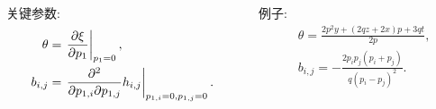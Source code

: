 \begin{frame}
\begin{columns}
\begin{column}{0.5\textwidth}
关键参数:
\[
\begin{split}
    \theta &= \left.{\frac{\partial \xi}{\partial p_1}}\right|_{p_1=0}, \\
    b_{i,j}&= \left.{\frac{\partial^2}{\partial p_{1,i}\partial p_{1,j}}h_{i,j}}\right|_{p_{1,i}=0,p_{1,j}=0}.
\end{split}
\]
\end{column}
\begin{column}{0.5\textwidth}
例子:
\[
\begin{split}
    &\theta=\frac{2p^2y+(2qz+2x)p+3qt}{2p}, \\ 
    &b_{i,j}=-\frac{2p_ip_j(p_i+p_j)}{q(p_i-p_j)^2}.
\end{split}
\]
\end{column}
\end{columns}
\begin{figure}
\setcounter{subfigure}{0}
\centering 
{}
\end{figure}
\end{frame}


